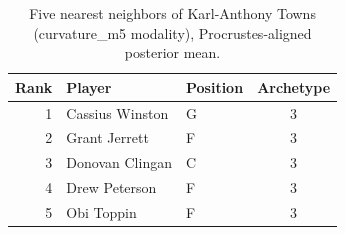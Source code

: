 \begin{table}[htbp]
  \centering\small
  \begin{tabular}{rllc}
    \toprule
    Rank & Player & Position & Archetype \\
    \midrule
    1 & Cassius Winston & G & 3 \\
    2 & Grant Jerrett & F & 3 \\
    3 & Donovan Clingan & C & 3 \\
    4 & Drew Peterson & F & 3 \\
    5 & Obi Toppin & F & 3 \\
    \bottomrule
  \end{tabular}
  \caption{Five nearest neighbors of Karl-Anthony Towns (curvature_m5 modality), Procrustes-aligned posterior mean.}
  \label{tab:Karl_Anthony_Towns_neighbors_curvature_m5}
\end{table}

